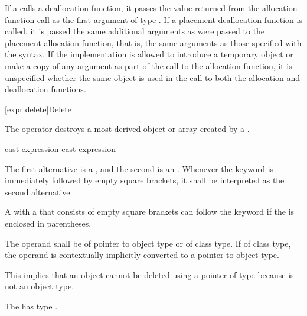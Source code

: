 \pnum
If a  calls a deallocation function, it passes
the value returned from the allocation function call as the first
argument of type . If a placement deallocation function is
called, it is passed the same additional arguments as were passed to the
placement allocation function, that is, the same arguments as those
specified with the  syntax.
If the implementation is allowed
to introduce a temporary object or make a copy of any argument
as part of the call to the allocation function,
it is unspecified whether the same object is used in the call
to both the allocation and deallocation functions.

[expr.delete]{Delete}

\pnum
{}%
%
The  operator destroys a most derived
object or array created by a
.

\begin{bnf}
\br
    \opt{\terminal{::}}  cast-expression\br
    \opt{\terminal{::}}  \terminal{[} \terminal{]} cast-expression
\end{bnf}

The first alternative is a
, and the
second is an .
Whenever the  keyword is immediately followed by empty square
brackets, it shall be interpreted as the second alternative.
\begin{footnote}
A
 with a 
that consists of empty square brackets can follow the  keyword
if the  is enclosed in parentheses.
\end{footnote}
The operand shall be of pointer to object type or of class type. If of
class type, the operand is contextually implicitly converted
to a pointer to object
type.
\begin{footnote}
This implies that an object
cannot be deleted using a pointer of type
 because  is not an object type.
\end{footnote}
The  has type
.

